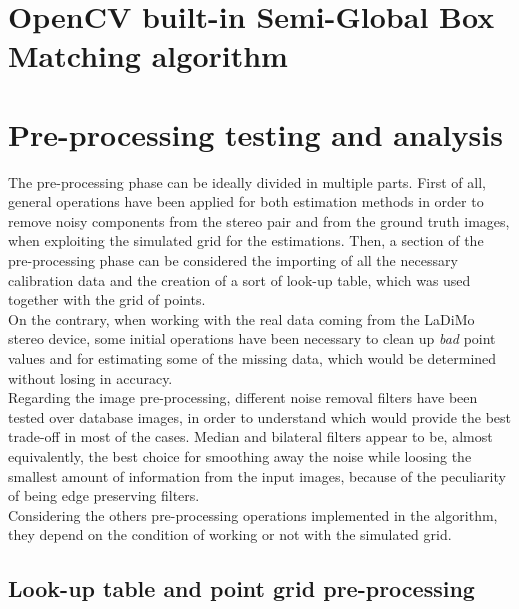 \section{OpenCV built-in Semi-Global Box Matching algorithm}
\label{section:opencv-sgm-method}

\section{Pre-processing testing and analysis}
\label{section:pre-processing-impl}

The pre-processing phase can be ideally divided in multiple parts.
First of all, general operations have been applied for both estimation methods in order to remove noisy components from the stereo pair and from the ground truth images, when exploiting the simulated grid for the estimations.
Then, a section of the pre-processing phase can be considered the importing of all the necessary calibration data and the creation of a sort of look-up table, which was used together with the grid of points.\\
On the contrary, when working with the real data coming from the LaDiMo stereo device, some initial operations have been necessary to clean up \textit{bad} point values and for estimating some of the missing data, which would be determined without losing in accuracy. \\
Regarding the image pre-processing, different noise removal filters have been tested over database images, in order to understand which would provide the best trade-off in most of the cases. 
Median and bilateral filters appear to be, almost equivalently, the best choice for smoothing away the noise while loosing the smallest amount of information from the input images, because of the peculiarity of being edge preserving filters. \\
Considering the others pre-processing operations implemented in the algorithm, they depend on the condition of working or not with the simulated grid.

\subsection{Look-up table and point grid pre-processing}
\label{subsection:grid-preprocessing}


